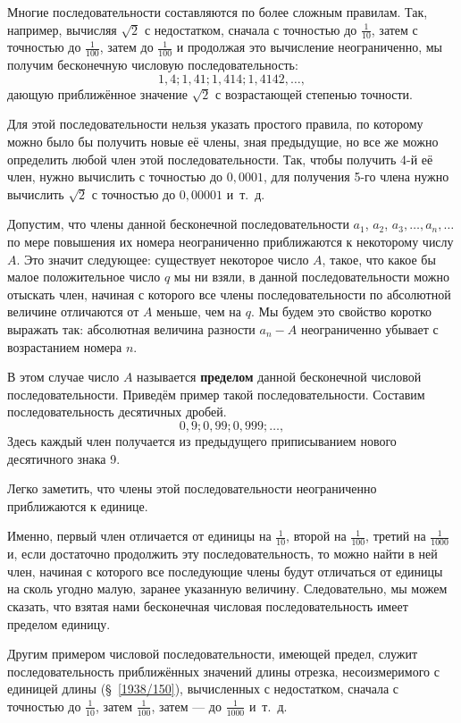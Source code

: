 Многие последовательности составляются по более сложным правилам.
Так, например, вычисляя $\sqrt{2}$ с недостатком, сначала с точностью до $\tfrac1{10}$, затем с точностью до $\tfrac1{100}$, затем до $\tfrac1{100}$ и продолжая это вычисление неограниченно, мы получим бесконечную числовую последовательность:
\[1{,}4;
1{,}41;
1{,}414;
1{,}4142,\dots,\]
дающую приближённое значение  $\sqrt{2}$  с возрастающей степенью точности.

Для этой последовательности нельзя указать простого правила, по которому можно было бы получить новые её члены, зная предыдущие, но все же можно определить любой член этой последовательности.
Так, чтобы получить 4-й её член, нужно вычислить с точностью до $0{,}0001$, для получения 5-го члена нужно вычислить  $\sqrt{2}$  с точностью до $0{,}00001$ и~т.~д.

Допустим, что члены данной бесконечной последовательности $a_1$, $a_2$, $a_3, \dots, a_n,\dots$ по мере повышения их номера неограниченно приближаются к некоторому числу $A$.
Это значит следующее:
существует некоторое число $A$, такое, что какое бы малое положительное число $q$ мы ни взяли, в данной последовательности можно отыскать член, начиная с которого все члены последовательности по абсолютной величине отличаются от $A$ меньше, чем на $q$.
Мы будем это свойство коротко выражать так:
 абсолютная величина разности $a_n-A$
неограниченно убывает с возрастанием номера $n$.

В этом случае число $A$ называется \textbf{пределом} данной бесконечной числовой последовательности.
Приведём пример такой последовательности.
Составим последовательность десятичных дробей.
\[0{,}9;
0{,}99;
0{,}999;\dots,\]
Здесь каждый член получается из предыдущего приписыванием нового десятичного знака 9.

Легко заметить, что члены этой последовательности неограниченно приближаются к единице.

Именно, первый член отличается от единицы на $\tfrac1{10}$, 
второй на $\tfrac1{100}$, третий на $\tfrac1{1000}$ и, если достаточно продолжить эту последовательность, то можно найти в ней член, начиная с которого все последующие члены будут отличаться от единицы на сколь угодно малую, заранее указанную величину.
Следовательно, мы можем сказать, что взятая нами бесконечная числовая последовательность имеет пределом единицу.

Другим примером числовой последовательности, имеющей предел, служит последовательность приближённых значений длины отрезка, несоизмеримого с единицей длины (§~\ref{1938/150}), вычисленных с недостатком, сначала с точностью до $\tfrac1{10}$, затем $\tfrac1{100}$, затем — до $\tfrac1{1000}$ и~т.~д.

